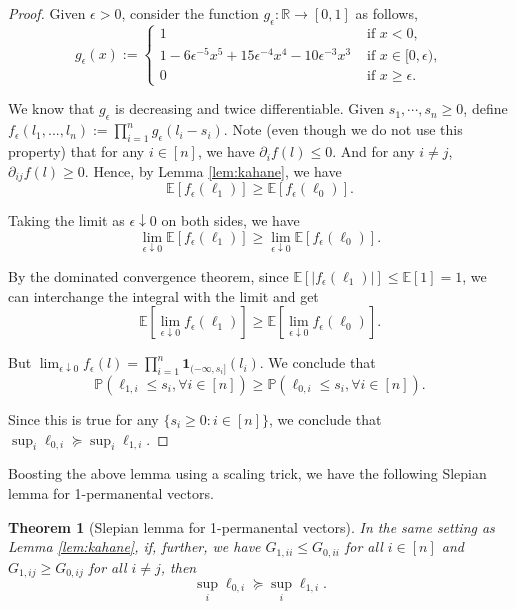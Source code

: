 \documentclass[a4paper, 11pt]{article}
\renewcommand{\P}{\mathbb{P}}
\newcommand{\E}{\mathbb{E}}
\newcommand{\ind}{\mathbf{1}}
\newtheorem{thm}{Theorem}[section]
\begin{document}
\begin{proof}
Given $\epsilon>0$, consider the function $g_\epsilon:\mathbb{R}\rightarrow [0,1]$ as follows,
\[g_\epsilon(x):=\begin{cases}
1& \text{ if }x< 0,\\
1-6\epsilon^{-5}x^5+15\epsilon^{-4}x^4-10\epsilon^{-3}x^3& \text{ if }x\in[0,\epsilon),\\
0& \text{ if }x\geq \epsilon.
\end{cases}\]

We know that $g_\epsilon$ is decreasing and twice differentiable. Given $s_1, \cdots, s_n\geq 0$, define $f_\epsilon(l_1,..., l_n) :=\prod_{i=1}^n g_\epsilon(l_i-s_i)$. Note (even though we do not use this property) that for any $i\in[n]$, we have $\partial_i f(l)\leq 0$. And for any $i\neq j$, $\partial_{ij}f(l)\geq 0$. Hence, by Lemma \ref{lem:kahane}, we have
\[\E[f_\epsilon(\ell_1)]\geq \E[f_\epsilon(\ell_0)].\]

Taking the limit as $\epsilon\downarrow 0$ on both sides, we have
\[\lim_{\epsilon\downarrow 0}\E[f_\epsilon(\ell_1)]\geq \lim_{\epsilon\downarrow 0}\E[f_\epsilon(\ell_0)].\]

By the dominated convergence theorem, since $\E[|f_\epsilon(\ell_1)|]\leq \E[1]=1$, we can
interchange the integral with the limit and get
\[\E[\lim_{\epsilon\downarrow 0}f_\epsilon(\ell_1)]\geq \E[\lim_{\epsilon\downarrow 0}f_\epsilon(\ell_0)].\]

But $\lim_{\epsilon\downarrow 0}f_\epsilon(l)=\prod_{i=1}^n\ind_{(-\infty, s_i]}(l_i)$. We conclude that
\[\P(\ell_{1,i}\leq s_i, \forall i\in[n])\geq \P(\ell_{0,i}\leq s_i, \forall i\in[n]).\]

Since this is true for any $\{s_i\geq 0 : i\in[n]\}$, we conclude that $\sup_i \ell_{0,i}\succeq \sup_i\ell_{1,i}$.
\end{proof}

Boosting the above lemma using a scaling trick, we have the following Slepian lemma for 1-permanental vectors.

\vspace{.3em} \begin{thm}[Slepian lemma for 1-permanental vectors]
\label{thm:slepian}
In the same setting as Lemma \ref{lem:kahane}, if, further, we have $G_{1,ii}\leq G_{0,ii}$ for all $i\in[n]$ and $G_{1,ij} \geq G_{0,ij}$ for all $i\neq j$, then
\[\sup_i \ell_{0,i}\succeq \sup_i\ell_{1,i}.\]
\end{thm}
\end{document}
